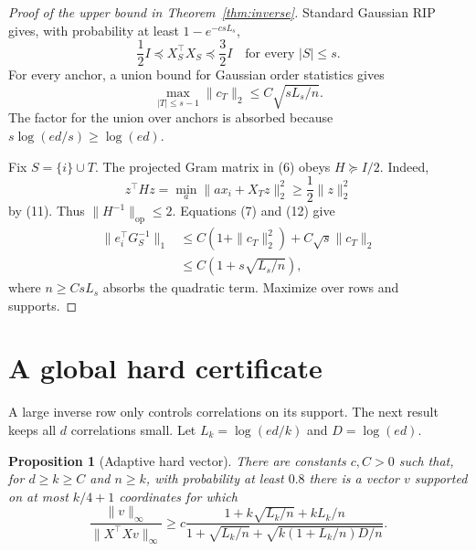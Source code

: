 \documentclass[twoside]{article}
\newtheorem{proposition}[theorem]{Proposition}
\begin{document}
\begin{proof}[Proof of the upper bound in Theorem~\ref{thm:inverse}]
Standard Gaussian RIP gives, with probability at least $1-e^{-csL_s}$, \[ \frac12I\preceq X_S^\top X_S\preceq\frac32I \quad\text{for every }|S|\leq s. \tag{11} \] For every anchor, a union bound for Gaussian order statistics gives \[ \max_{|T|\leq s-1}\|c_T\|_2 \leq C\sqrt{sL_s/n}. \tag{12} \] The factor for the union over anchors is absorbed because $s\log(ed/s)\geq\log(ed)$.

Fix $S=\{i\}\cup T$. The projected Gram matrix in (6) obeys $H\succeq I/2$. Indeed, \[ z^\top Hz=\min_a\|a x_i+X_Tz\|_2^2 \geq\frac12\|z\|_2^2 \] by (11). Thus $\|H^{-1}\|_{\mathrm{op}}\leq2$. Equations (7) and (12) give
\begin{align*}
 \|e_i^\top G_S^{-1}\|_1
 &\leq C(1+\|c_T\|_2^2)
   +C\sqrt{s}\|c_T\|_2\\
 &\leq C(1+s\sqrt{L_s/n}),
\end{align*}
where $n\geq CsL_s$ absorbs the quadratic term. Maximize over rows and supports.
\end{proof}

\section{A global hard certificate}
\label{sec:certificate}

A large inverse row only controls correlations on its support. The next result keeps all $d$ correlations small. Let $L_k=\log(ed/k)$ and $D=\log(ed)$.

\begin{proposition}[Adaptive hard vector]
\label{prop:certificate}
There are constants $c,C>0$ such that, for $d\geq k\geq C$ and $n\geq k$, with probability at least $0.8$ there is a vector $v$ supported on at most $k/4+1$ coordinates for which \[ \frac{\|v\|_\infty}{\|X^\top Xv\|_\infty} \geq c\frac{1+k\sqrt{L_k/n}+kL_k/n} {1+\sqrt{L_k/n}+\sqrt{k(1+L_k/n)D/n}}. \tag{13} \]
\end{proposition}
\end{document}
